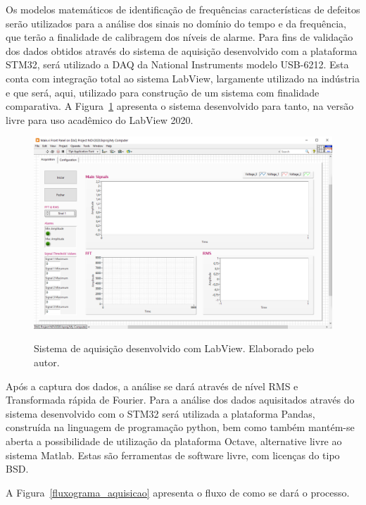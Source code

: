 \documentclass[
	12pt,				
	oneside,			
	a4paper,			
	english,			
	brazil,			
	]{abntex2ppgsi}
\begin{document}
Os modelos matemáticos de identificação de frequências características de defeitos serão utilizados para a análise dos sinais no domínio do tempo e da frequência, que terão a finalidade de calibragem dos níveis de alarme. Para fins de validação dos dados obtidos através do sistema de aquisição desenvolvido com a plataforma STM32, será utilizado a DAQ da National Instruments modelo USB-6212. Esta conta com integração total ao sistema LabView, largamente utilizado na indústria e que será, aqui, utilizado para construção de um sistema com finalidade comparativa. A Figura~\ref{sistema_labview} apresenta o sistema desenvolvido para tanto, na versão livre para uso acadêmico do LabView 2020.

\begin{figure}[H]
\centering
\caption {Sistema de aquisição desenvolvido com LabView. Elaborado pelo autor.}
\includegraphics[width=\textwidth,height=\textheight,keepaspectratio]{sistema_labview}
\label{sistema_labview}
\end{figure} 

Após a captura dos dados, a análise se dará através de nível RMS e Transformada rápida de Fourier. Para a análise dos dados aquisitados através do sistema desenvolvido com o STM32 será utilizada a plataforma Pandas, construída na linguagem de programação python, bem como também mantém-se aberta a possibilidade de utilização da plataforma Octave, alternative livre ao sistema Matlab. Estas são ferramentas de software livre, com licenças do tipo BSD. 

A Figura~\ref{fluxograma_aquisicao} apresenta o fluxo de como se dará o processo.
\end{document}
